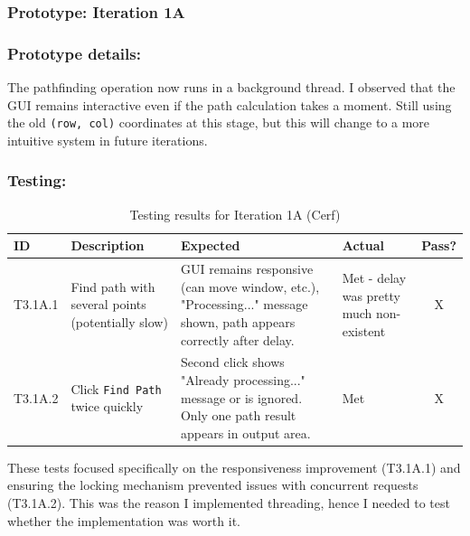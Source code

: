 \newpage
\subsubsection*{Prototype: Iteration 1A}




\subsubsection{Prototype details:}
The pathfinding operation now runs in a background thread. I observed that the GUI remains interactive even if the path calculation takes a moment. Still using the old \verb|(row, col)| coordinates at this stage, but this will change to a more intuitive system in future iterations.

\subsubsection{Testing:}
\begin{table}[htbp]
	\centering
	\begin{tabularx}{\textwidth}{|l|X|p{4.5cm}|p{1.5cm}|c|}
		\hline
		\textbf{ID} & \textbf{Description} & \textbf{Expected} & \textbf{Actual} & \textbf{Pass?} \\
		\hline
		T3.1A.1 & Find path with several points (potentially slow) & GUI remains responsive (can move window, etc.), "Processing..." message shown, path appears correctly after delay. & Met - delay was pretty much non-existent & X \\
		\hline
		T3.1A.2 & Click \verb|Find Path| twice quickly & Second click shows "Already processing..." message or is ignored. Only one path result appears in output area. & Met & X \\
		\hline
	\end{tabularx}
	\caption{Testing results for Iteration 1A (Cerf)}
\end{table}
These tests focused specifically on the responsiveness improvement (T3.1A.1) and ensuring the locking mechanism prevented issues with concurrent requests (T3.1A.2). This was the reason I implemented threading, hence I needed to test whether the implementation was worth it.

